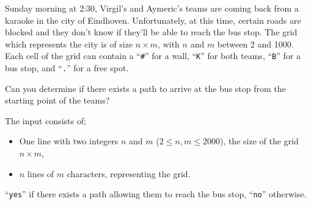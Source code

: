 \problemname{\problemyamlname}


Sunday morning at 2:30, Virgil's and Aymeric's teams are coming back from a karaoke in the city of Eindhoven.
Unfortunately, at this time, certain roads are blocked and they don't know if they'll be able to reach the bus stop.
The grid which represents the city is of size $n \times m$, with $n$ and $m$ between 2 and 1000.
Each cell of the grid can contain a ``\verb|#|'' for a wall, ``\verb|K|'' for both teams, ``\verb|B|'' for a bus stop, and ``\verb|.|'' for a free spot.

Can you determine if there exists a path to arrive at the bus stop from the starting point of the teams?

\begin{Input}
	The input consists of;
	\begin{itemize}
		\item One line with two integers $n$ and $m$ ($2 \le n, m \le 2000$), the size of the grid $n \times m$,
		\item $n$ lines of $m$ characters, representing the grid.
	\end{itemize}
\end{Input}

\begin{Output}
	``\verb|yes|'' if there exists a path allowing them to reach the bus stop,
	``\verb|no|'' otherwise.
\end{Output}
